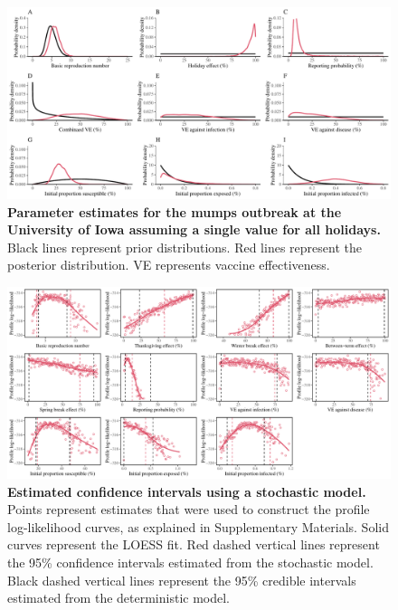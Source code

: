 \documentclass[12pt]{article}
\begin{document}
\pagebreak

\begin{figure}[!th]
\begin{center}
\includegraphics[width=\textwidth]{../figure_stanfit_seirv_final/figure_stanfit_param_avg.pdf}
\caption{
\textbf{Parameter estimates for the mumps outbreak at the University of Iowa assuming a single value for all holidays.}
Black lines represent prior distributions.
Red lines represent the posterior distribution.
VE represents vaccine effectiveness.
}
\end{center}
\end{figure}

\pagebreak

\begin{figure}[!h]
\includegraphics[width=\textwidth]{../pomp/figure_pomp_loglik.pdf}
\caption{
\textbf{Estimated confidence intervals using a stochastic model.}
Points represent estimates that were used to construct the profile log-likelihood curves, as explained in Supplementary Materials.
Solid curves represent the LOESS fit.
Red dashed vertical lines represent the 95\% confidence intervals estimated from the stochastic model.
Black dashed vertical lines represent the 95\% credible intervals estimated from the deterministic model.
}
\end{figure}
\end{document}
